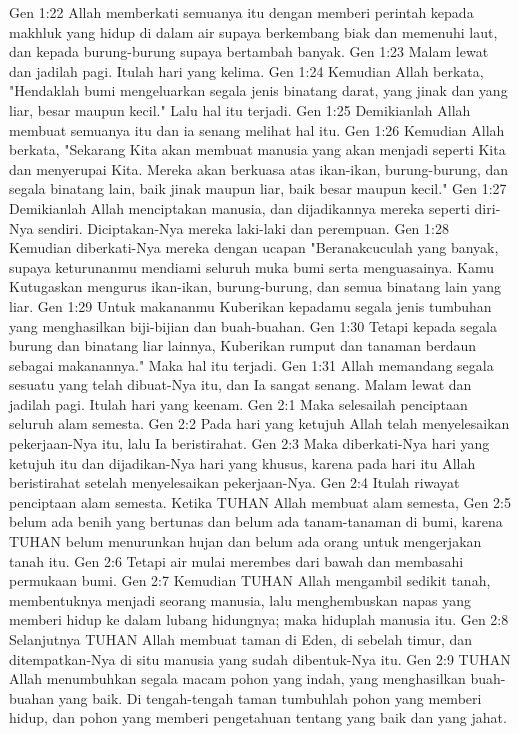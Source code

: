 Gen 1:22  Allah memberkati semuanya itu dengan memberi perintah kepada makhluk yang hidup di dalam air supaya berkembang biak dan memenuhi laut, dan kepada burung-burung supaya bertambah banyak.
Gen 1:23  Malam lewat dan jadilah pagi. Itulah hari yang kelima.
Gen 1:24  Kemudian Allah berkata, "Hendaklah bumi mengeluarkan segala jenis binatang darat, yang jinak dan yang liar, besar maupun kecil." Lalu hal itu terjadi.
Gen 1:25  Demikianlah Allah membuat semuanya itu dan ia senang melihat hal itu.
Gen 1:26  Kemudian Allah berkata, "Sekarang Kita akan membuat manusia yang akan menjadi seperti Kita dan menyerupai Kita. Mereka akan berkuasa atas ikan-ikan, burung-burung, dan segala binatang lain, baik jinak maupun liar, baik besar maupun kecil."
Gen 1:27  Demikianlah Allah menciptakan manusia, dan dijadikannya mereka seperti diri-Nya sendiri. Diciptakan-Nya mereka laki-laki dan perempuan.
Gen 1:28  Kemudian diberkati-Nya mereka dengan ucapan "Beranakcuculah yang banyak, supaya keturunanmu mendiami seluruh muka bumi serta menguasainya. Kamu Kutugaskan mengurus ikan-ikan, burung-burung, dan semua binatang lain yang liar.
Gen 1:29  Untuk makananmu Kuberikan kepadamu segala jenis tumbuhan yang menghasilkan biji-bijian dan buah-buahan.
Gen 1:30  Tetapi kepada segala burung dan binatang liar lainnya, Kuberikan rumput dan tanaman berdaun sebagai makanannya." Maka hal itu terjadi.
Gen 1:31  Allah memandang segala sesuatu yang telah dibuat-Nya itu, dan Ia sangat senang. Malam lewat dan jadilah pagi. Itulah hari yang keenam.
Gen 2:1  Maka selesailah penciptaan seluruh alam semesta.
Gen 2:2  Pada hari yang ketujuh Allah telah menyelesaikan pekerjaan-Nya itu, lalu Ia beristirahat.
Gen 2:3  Maka diberkati-Nya hari yang ketujuh itu dan dijadikan-Nya hari yang khusus, karena pada hari itu Allah beristirahat setelah menyelesaikan pekerjaan-Nya.
Gen 2:4  Itulah riwayat penciptaan alam semesta. Ketika TUHAN Allah membuat alam semesta,
Gen 2:5  belum ada benih yang bertunas dan belum ada tanam-tanaman di bumi, karena TUHAN belum menurunkan hujan dan belum ada orang untuk mengerjakan tanah itu.
Gen 2:6  Tetapi air mulai merembes dari bawah dan membasahi permukaan bumi.
Gen 2:7  Kemudian TUHAN Allah mengambil sedikit tanah, membentuknya menjadi seorang manusia, lalu menghembuskan napas yang memberi hidup ke dalam lubang hidungnya; maka hiduplah manusia itu.
Gen 2:8  Selanjutnya TUHAN Allah membuat taman di Eden, di sebelah timur, dan ditempatkan-Nya di situ manusia yang sudah dibentuk-Nya itu.
Gen 2:9  TUHAN Allah menumbuhkan segala macam pohon yang indah, yang menghasilkan buah-buahan yang baik. Di tengah-tengah taman tumbuhlah pohon yang memberi hidup, dan pohon yang memberi pengetahuan tentang yang baik dan yang jahat.
